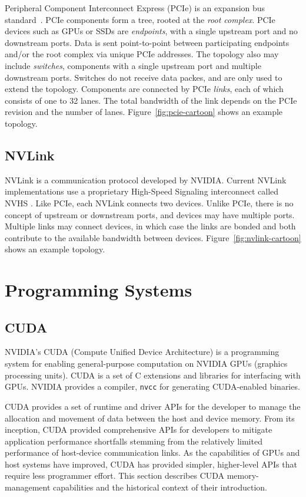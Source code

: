 Peripheral Component Interconnect Express (PCIe) is an expansion bus standard~\cite{pcie10a}.
PCIe components form a tree, rooted at the \textit{root complex}.
PCIe devices such as GPUs or SSDs are \textit{endpoints}, with a single upstream port and no downstream ports.
Data is sent point-to-point between participating endpoints and/or the root complex via unique PCIe addresses.
The topology also may include \textit{switches}, components with a single upstream port and multiple downstream ports.
Switches do not receive data packes, and are only used to extend the topology.
Components are connected by PCIe \textit{links}, each of which consists of one to 32 lanes.
The total bandwidth of the link depends on the PCIe revision and the number of lanes.
Figure~\ref{fig:pcie-cartoon} shows an example topology.




\subsection{NVLink}

NVLink is a communication protocol developed by NVIDIA.
Current NVLink implementations use a proprietary High-Speed Signaling interconnect called NVHS \cite{harris2016insidepascal}.
Like PCIe, each NVLink connects two devices.
Unlike PCIe, there is no concept of upstream or downstream ports, and devices may have multiple ports.
Multiple links may connect devices, in which case the links are bonded and both contribute to the available bandwidth between devices.
Figure~\ref{fig:nvlink-cartoon} shows an example topology.




%
%
%
\section{Programming Systems}
\subsection{CUDA}
\label{sec:cuda}


NVIDIA's CUDA (Compute Unified Device Architecture) is a programming system for enabling general-purpose computation on NVIDIA GPUs (graphics processing units).
CUDA is a set of C extensions and libraries for interfacing with GPUs.
NVIDIA provides a compiler, \texttt{nvcc} for generating CUDA-enabled binaries.

CUDA provides a set of runtime and driver APIs for the developer to manage the allocation and movement of data between the host and device memory.
From its inception, CUDA provided comprehensive APIs for developers to mitigate application performance shortfalls stemming from the relatively limited performance of host-device communication links.
As the capabilities of GPUs and host systems have improved, CUDA has provided simpler, higher-level APIs that require less programmer effort.
This section describes CUDA memory-management capabilities and the historical context of their introduction.

